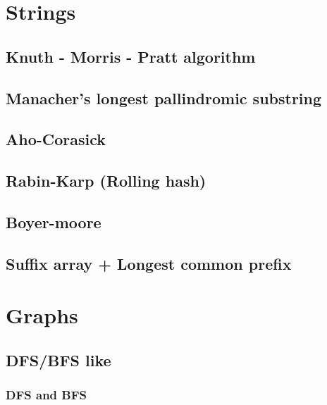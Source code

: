 \documentclass[a4paper]{article}
\begin{document}
\begin{multicols*}{2}
\setlength{\parskip}{0.0in}
\tableofcontents
\setlength{\parskip}{0.1in}

\section{Strings}
    \subsection{Knuth - Morris - Pratt algorithm}
        
    \subsection{Manacher's longest pallindromic substring}
        
    \subsection{Aho-Corasick}
        
    \subsection{Rabin-Karp (Rolling hash)}
        
    \subsection{Boyer-moore}
        
    \subsection{Suffix array + Longest common prefix}
        

\section{Graphs}
    \subsection{DFS/BFS like}
        \subsubsection{DFS and BFS}
            

\end{multicols*}
\end{document}
